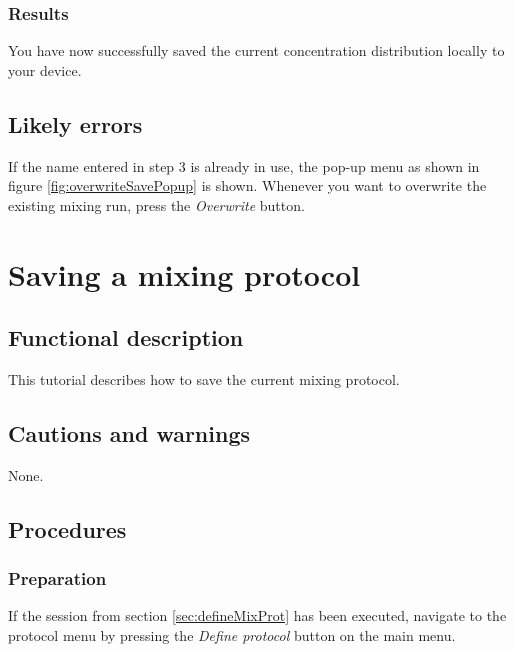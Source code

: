 \subsubsection{Results}
You have now successfully saved the current concentration distribution locally to your device.

\subsection{Likely errors}
If the name entered in step 3 is already in use, the pop-up menu as shown in figure \ref{fig:overwriteSavePopup} is shown. Whenever you want to overwrite the existing mixing run, press the \emph{Overwrite} button.



\section{Saving a mixing protocol}\label{sec:savmixprot}

\subsection{Functional description}
This tutorial describes how to save the current mixing protocol.

\subsection{Cautions and warnings}
None.

\subsection{Procedures}

\subsubsection{Preparation}
If the session from section \ref{sec:defineMixProt} has been executed, navigate to the protocol menu by pressing the \emph{Define protocol} button on the main menu.

